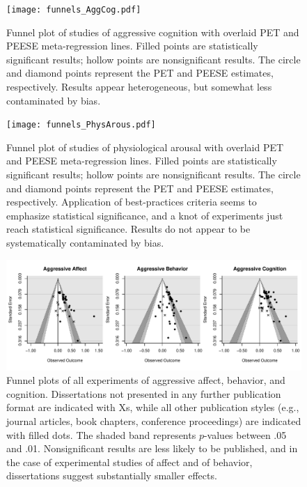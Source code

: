 \documentclass[man, mask]{apa6}
\begin{document}
\begin{figure}
	\texttt{[image: funnels\_AggCog.pdf]}
	\caption{Funnel plot of studies of aggressive cognition with overlaid PET and PEESE meta-regression lines. Filled points are statistically significant results; hollow points are nonsignificant results. The circle and diamond points represent the PET and PEESE estimates, respectively. Results appear heterogeneous, but somewhat less contaminated by bias.}
	\label{funnel-aggcog}
\end{figure}

\begin{figure}
	\texttt{[image: funnels\_PhysArous.pdf]}
	\caption{Funnel plot of studies of physiological arousal with overlaid PET and PEESE meta-regression lines. Filled points are statistically significant results; hollow points are nonsignificant results. The circle and diamond points represent the PET and PEESE estimates, respectively. Application of best-practices criteria seems to emphasize statistical significance, and a knot of experiments just reach statistical significance. Results do not appear to be systematically contaminated by bias.}
	\label{funnel-physarous}
\end{figure}

\begin{figure}
	\includegraphics[width = \textwidth, keepaspectratio]{funnel_diss.pdf}
	\caption{Funnel plots of all experiments of aggressive affect, behavior, and cognition. Dissertations not presented in any further publication format are indicated with Xs, while all other publication styles (e.g., journal articles, book chapters, conference proceedings) are indicated with filled dots. The shaded band represents $p$-values between .05 and .01. Nonsignificant results are less likely to be published, and in the case of experimental studies of affect and of behavior, dissertations suggest substantially smaller effects.}
	\label{funnel-diss}
\end{figure}
\end{document}
